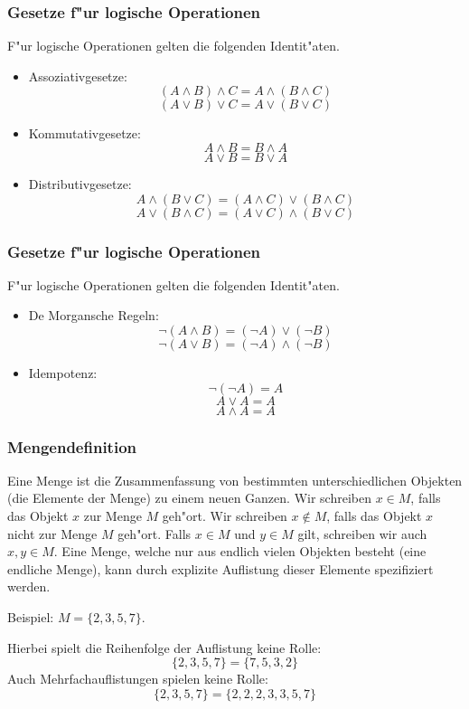 \documentclass{beamer}
\begin{document}
\begin{frame}
  \frametitle{Gesetze f"ur logische Operationen}
  F"ur logische Operationen gelten die folgenden Identit"aten. 
  \begin{itemize}
    \item Assoziativgesetze: \[(A\wedge B)\wedge C = A\wedge(B\wedge C)\] \[(A\vee B)\vee C = A\vee(B\vee C)\]
    \item Kommutativgesetze: \[A\wedge B = B\wedge A\]\[A\vee B = B\vee A\]
    \item Distributivgesetze: \[A \wedge (B\vee C) = (A\wedge C)\vee (B\wedge C)\] \[A\vee (B\wedge C) = (A\vee C)\wedge (B\vee C)\]
  \end{itemize}
   
\end{frame}
\begin{frame}
  \frametitle{Gesetze f"ur logische Operationen}
  F"ur logische Operationen gelten die folgenden Identit"aten. 
  \begin{itemize}
    \item De Morgansche Regeln: \[\neg(A\wedge B) = (\neg A)\vee(\neg B)\]\[\neg(A\vee B) = (\neg A)\wedge(\neg B)\]
    \item Idempotenz: \[\neg(\neg A) = A\]\[A\vee A = A\]\[A\wedge A = A\]
  \end{itemize}
   
\end{frame}

\begin{frame}
  \frametitle{Mengendefinition}
  \begin{definition}
    Eine Menge ist die Zusammenfassung von bestimmten unterschiedlichen
    Objekten (die Elemente der Menge) zu einem neuen Ganzen.
    Wir schreiben $x\in M$, falls das Objekt $x$ zur Menge $M$ geh"ort.
    Wir schreiben $x\notin M$, falls das Objekt $x$ nicht zur Menge $M$ geh"ort.
    Falls $x\in M$ und $y\in M$ gilt, schreiben wir auch $x, y \in M$.
    Eine Menge, welche nur aus endlich vielen Objekten besteht (eine endliche
    Menge), kann durch explizite Auflistung dieser Elemente spezifiziert
    werden.
  \end{definition}
    Beispiel: $M=\{2,3,5,7\}$.

    Hierbei spielt die Reihenfolge der Auflistung keine Rolle:
    \[\{2,3,5,7\}=\{7,5,3,2\}\]
    Auch Mehrfachauflistungen spielen keine Rolle:
    \[\{2,3,5,7\}=\{2,2,2,3,3,5,7\}\]
  \end{frame}
\end{document}
